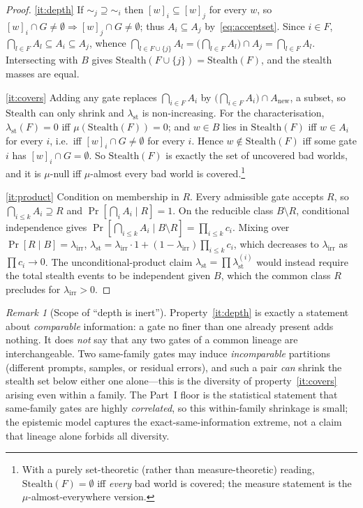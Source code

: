 \documentclass[11pt]{article}
\theoremstyle{definition}
\theoremstyle{remark}
\newtheorem{remark}{Remark}
\newcommand{\lst}{\lambda_{\mathrm{st}}}
\newcommand{\lirr}{\lambda_{\mathrm{irr}}}
\newcommand{\Stealth}{\mathrm{Stealth}}
\begin{document}
\begin{proof}
\eqref{it:depth} If $\sim_j\supseteq\sim_i$ then $[w]_i\subseteq[w]_j$ for every $w$, so
$[w]_i\cap G\neq\emptyset\Rightarrow[w]_j\cap G\neq\emptyset$; thus $A_i\subseteq A_j$
by~\eqref{eq:acceptset}. Since $i\in F$, $\bigcap_{l\in F}A_l\subseteq A_i\subseteq A_j$, whence
$\bigcap_{l\in F\cup\{j\}}A_l=\big(\bigcap_{l\in F}A_l\big)\cap A_j=\bigcap_{l\in F}A_l$. Intersecting
with $B$ gives $\Stealth(F\cup\{j\})=\Stealth(F)$, and the stealth masses are equal.

\eqref{it:covers} Adding any gate replaces $\bigcap_{i\in F}A_i$ by
$\big(\bigcap_{i\in F}A_i\big)\cap A_{\mathrm{new}}$, a subset, so $\Stealth$ can only shrink and
$\lst$ is non-increasing. For the characterisation, $\lst(F)=0$ iff $\mu(\Stealth(F))=0$; and
$w\in B$ lies in $\Stealth(F)$ iff $w\in A_i$ for every $i$, i.e.\ iff $[w]_i\cap G\neq\emptyset$ for
every $i$. Hence $w\notin\Stealth(F)$ iff some gate $i$ has $[w]_i\cap G=\emptyset$. So
$\Stealth(F)$ is exactly the set of uncovered bad worlds, and it is $\mu$-null iff $\mu$-almost every
bad world is covered.\footnote{With a purely set-theoretic (rather than measure-theoretic) reading,
$\Stealth(F)=\emptyset$ iff \emph{every} bad world is covered; the measure statement is the
$\mu$-almost-everywhere version.}

\eqref{it:product} Condition on membership in $R$. Every admissible gate accepts $R$, so
$\bigcap_{i\le k}A_i\supseteq R$ and $\Pr[\bigcap_i A_i\mid R]=1$. On the reducible class $B\setminus R$,
conditional independence gives $\Pr[\bigcap_{i\le k}A_i\mid B\setminus R]=\prod_{i\le k}c_i$. Mixing over
$\Pr[R\mid B]=\lirr$,
$\lst=\lirr\cdot1+(1-\lirr)\prod_{i\le k}c_i$, which decreases to $\lirr$ as $\prod c_i\to0$. The
unconditional-product claim $\lst=\prod\lst^{(i)}$ would instead require the total stealth events to be
independent given $B$, which the common class $R$ precludes for $\lirr>0$.
\end{proof}

\begin{remark}[Scope of ``depth is inert'']\label{rem:incomparable}
Property~\eqref{it:depth} is exactly a statement about \emph{comparable} information: a gate no finer
than one already present adds nothing. It does \emph{not} say that any two gates of a common lineage
are interchangeable. Two same-family gates may induce \emph{incomparable} partitions (different
prompts, samples, or residual errors), and such a pair \emph{can} shrink the stealth set below either
one alone---this is the diversity of property~\eqref{it:covers} arising even within a family. The
Part~I floor is the statistical statement that same-family gates are highly \emph{correlated}, so this
within-family shrinkage is small; the epistemic model captures the exact-same-information extreme, not
a claim that lineage alone forbids all diversity.
\end{remark}
\end{document}
